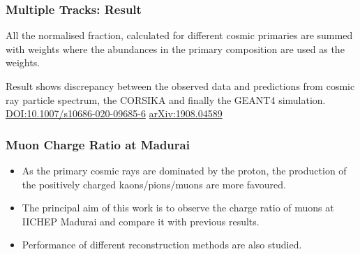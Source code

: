 \documentclass{beamer}
\begin{document}

\begin{frame}
  \frametitle{Multiple Tracks: Result}
  All the normalised fraction, calculated for
  different cosmic primaries are summed with weights where the
  abundances in the primary composition are
  used as the weights.  
  \begin{table}[btbp]
    \centering
  \end{table}
  Result shows discrepancy between the observed data and 
  predictions from cosmic ray particle spectrum, the CORSIKA and
  finally the GEANT4 simulation.\\
  \vspace{30pt}
  \href{https://doi.org/10.1007/s10686-020-09685-6}{DOI:10.1007/s10686-020-09685-6} \hspace{10pt} \href{https://arxiv.org/abs/1908.04589}{arXiv:1908.04589}
\end{frame}



\begin{frame}
  \frametitle{Muon Charge Ratio at Madurai}
  \begin{itemize} %
  \item As the primary cosmic rays are dominated by the proton,
    the production of the positively charged kaons/pions/muons are
    more favoured.
  \item The principal aim of this work is to observe the charge ratio
    of muons at IICHEP Madurai and compare it with previous results.
  \item Performance of different reconstruction methods are
    also studied.
  \end{itemize}
\end{frame}
\end{document}
